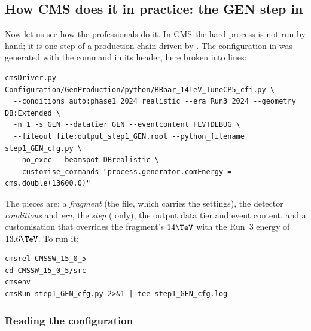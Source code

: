 \subsection{How CMS does it in practice: the GEN step in \CMSSW}
\label{sec:ancestral_home:cmssw}

Now let us see how the professionals do it. In CMS the hard process is not
run by hand; it is one step of a production chain driven by
. The configuration in
 was generated with the command in
its header, here broken into lines:
\begin{verbatim}
cmsDriver.py Configuration/GenProduction/python/BBbar_14TeV_TuneCP5_cfi.py \
  --conditions auto:phase1_2024_realistic --era Run3_2024 --geometry DB:Extended \
  -n 1 -s GEN --datatier GEN --eventcontent FEVTDEBUG \
  --fileout file:output_step1_GEN.root --python_filename step1_GEN_cfg.py \
  --no_exec --beamspot DBrealistic \
  --customise_commands "process.generator.comEnergy = cms.double(13600.0)"
\end{verbatim}
The pieces are: a \emph{fragment} (the \code{\_cfi.py} file, which carries the
\PYTHIA settings), the detector \emph{conditions} and \emph{era}, the
\emph{step} (\code{GEN} only), the output data tier and event content, and a
customisation that overrides the fragment's $14\TeV$ with the Run~3 energy
of $13.6\TeV$. To run it:
\begin{verbatim}
cmsrel CMSSW_15_0_5
cd CMSSW_15_0_5/src
cmsenv
cmsRun step1_GEN_cfg.py 2>&1 | tee step1_GEN_cfg.log
\end{verbatim}

\subsubsection{Reading the configuration}

